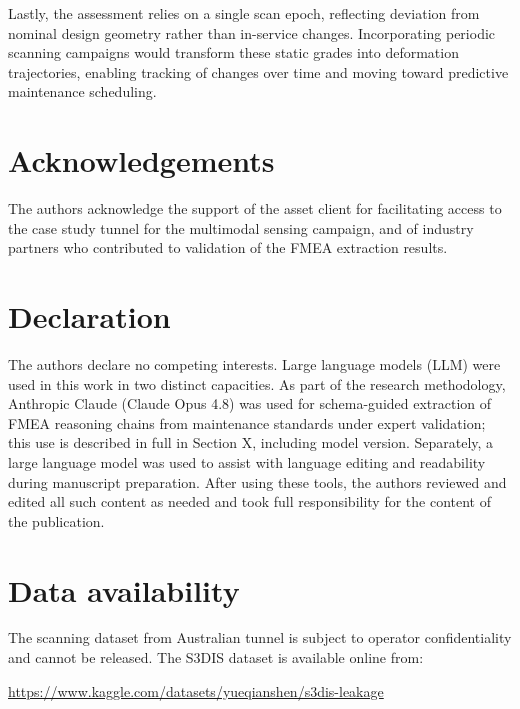 \documentclass[preprint,12pt,authoryear]{elsarticle}
\begin{document}
Lastly, the assessment relies on a single scan epoch, reflecting
deviation from nominal design geometry rather than in-service changes.
Incorporating periodic scanning campaigns would transform these static
grades into deformation trajectories, enabling tracking of changes over
time and moving toward predictive maintenance scheduling.

\section*{Acknowledgements}\label{acknowledgements}

The authors acknowledge the support of the asset client for facilitating
access to the case study tunnel for the multimodal sensing campaign, and
of industry partners who contributed to validation of the FMEA
extraction results.

\section*{Declaration}\label{declaration}

The authors declare no competing interests. Large language models (LLM)
were used in this work in two distinct capacities. As part of the
research methodology, Anthropic Claude (Claude Opus 4.8) was used for
schema-guided extraction of FMEA reasoning chains from maintenance
standards under expert validation; this use is described in full in
Section X, including model version. Separately, a large language model
was used to assist with language editing and readability during
manuscript preparation. After using these tools, the authors reviewed
and edited all such content as needed and took full responsibility for
the content of the publication.

\section*{Data availability}\label{data-availability}

The scanning dataset from Australian tunnel is subject to operator
confidentiality and cannot be released. The S3DIS dataset is available
online from:

\url{https://www.kaggle.com/datasets/yueqianshen/s3dis-leakage}


\clearpage

\nocite{*}

\end{document}
